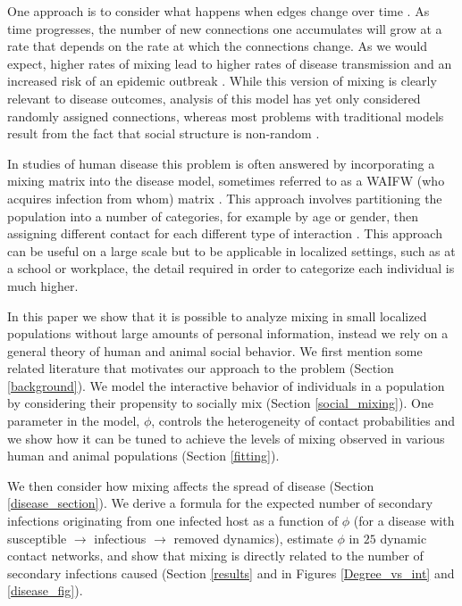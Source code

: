 \documentclass[10pt]{article}
\begin{document}
\begin{multicols}{2}
One approach is to consider what happens when edges change over time \cite{Volz2925}. As time progresses, the number of new connections one accumulates will grow at a rate that depends on the rate at which the connections change. As we would expect, higher rates of mixing lead to higher rates of disease transmission and an increased risk of an epidemic outbreak \cite{volz2009epidemic}. While this version of mixing is clearly relevant to disease outcomes, analysis of this model has yet only considered randomly assigned connections, whereas most problems with traditional models result from the fact that social structure is non-random \cite{Bansal879}. 

In studies of human disease this problem is often answered by incorporating a mixing matrix into the disease model, sometimes referred to as a WAIFW (who acquires infection from whom) matrix \cite{anderson1992infectious}. This approach involves partitioning the population into a number of categories, for example by age or gender, then assigning different contact for each different type of interaction \cite{castillo1989epidemiological,DelValle2007539}. This approach can be useful on a large scale but to be applicable in localized settings, such as at a school or workplace, the detail required in order to categorize each individual is much higher. 

In this paper we show that it is possible to analyze mixing in small localized populations without large amounts of personal information, instead we rely on a general theory of human and animal social behavior. We first mention some related literature that motivates our approach to the problem (Section \ref{background}). We model the interactive behavior of individuals in a population by considering their propensity to socially mix (Section \ref{social_mixing}). One parameter in the model, $\phi$, controls the heterogeneity of contact probabilities and we show how it can be tuned to achieve the levels of mixing observed in various human and animal populations (Section \ref{fitting}). 

We then consider how mixing affects the spread of disease (Section \ref{disease_section}). We derive a formula for the expected number of secondary infections originating from one infected host as a function of $\phi$ (for a disease with susceptible $\rightarrow$ infectious $\rightarrow$ removed dynamics), estimate $\phi$ in $25$ dynamic contact networks, and show that mixing is directly related to the number of secondary infections caused (Section \ref{results} and in Figures \ref{Degree_vs_int} and \ref{disease_fig}).


\end{multicols}
\end{document}
